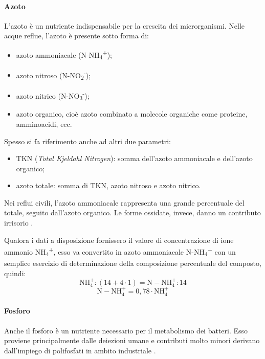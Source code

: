 \paragraph*{Azoto}
L'azoto è un nutriente indispensabile per la crescita dei microrganismi. Nelle acque reflue, l'azoto è presente sotto forma di:
\begin{itemize}
	\item azoto ammoniacale (N-NH\textsubscript{4}\textsuperscript{+});
	\item azoto nitroso (N-NO\textsubscript{2}\textsuperscript{-});
	\item azoto nitrico (N-NO\textsubscript{3}\textsuperscript{-});
	\item azoto organico, cioè azoto combinato a molecole organiche come proteine, amminoacidi, ecc.
\end{itemize}
Spesso si fa riferimento anche ad altri due parametri:
\begin{itemize}
	\item TKN (\textit{Total Kjeldahl Nitrogen}): somma dell'azoto ammoniacale e dell'azoto organico;
	\item azoto totale: somma di TKN, azoto nitroso e azoto nitrico.
\end{itemize}
Nei reflui civili, l'azoto ammoniacale rappresenta una grande percentuale del totale, seguito dall'azoto organico. Le forme ossidate, invece, danno un contributo irrisorio \cite{collivignarelli2012ingegneria}.

Qualora i dati a disposizione fornissero il valore di concentrazione di ione ammonio NH\textsubscript{4}\textsuperscript{+}, esso va convertito in azoto ammoniacale N-NH\textsubscript{4}\textsuperscript{+} con un semplice esercizio di determinazione della composizione percentuale del composto, quindi:
\begin{equation}
\operatorname{NH_{4}^{+}}:(14+4\cdot 1)=\operatorname{N-NH_{4}^{+}}:14
\end{equation}
\begin{equation}
\operatorname{N-NH_{4}^{+}}=0,78\cdot \operatorname{NH_{4}^{+}}
\end{equation}
\paragraph*{Fosforo}
Anche il fosforo è un nutriente necessario per il metabolismo dei batteri. Esso proviene principalmente dalle deiezioni umane e contributi molto minori derivano dall'impiego di polifosfati in ambito industriale \cite{bonomo2008trattamenti}.


